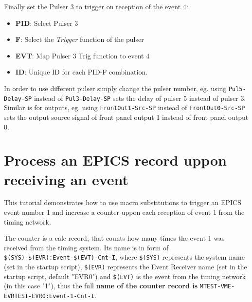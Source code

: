 \documentclass[12pt,a4paper]{article}
\begin{document}
Finally set the Pulser 3 to trigger on reception of the event 4:
\begin{itemize}
	\item \textbf{PID}: Select Pulser 3
	\item \textbf{F}: Select the \textit{Trigger} function of the pulser
	\item \textbf{EVT}: Map Pulser 3 Trig function to event 4
	\item \textbf{ID}: Unique ID for each PID-F combination.
\end{itemize}

In order to use different pulser simply change the pulser number, eg. using \texttt{Pul5-Delay-SP} instead of \texttt{Pul3-Delay-SP} sets the delay of pulser 5 instead of pulser 3.
Similar is for outputs, eg. using \texttt{FrontOut1-Src-SP} instead of \texttt{FrontOut0-Src-SP} sets the output source signal of front panel output 1 instead of front panel output 0.

\section{Process an EPICS record uppon receiving an event}
This tutorial demonstrates how to use macro substitutions to trigger an EPICS event number 1 and increase a counter uppon each reception of event 1 from the timing network.

The counter is a calc record, that counts how many times the event 1 was received from the timing system. Its name is in form of \texttt{\$(SYS)-\$(EVR):Event-\$(EVT)-Cnt-I}, where \texttt{\$(SYS)} represents the system name (set in the startup script), \texttt{\$(EVR)} represents the Event Receiver name (set in the startup script, default "EVR0") and \texttt{\$(EVT)} is the event from the timing network (in this case "1"), thus the full \textbf{name of the counter record is} \texttt{MTEST-VME-EVRTEST-EVR0:Event-1-Cnt-I}.
\end{document}
